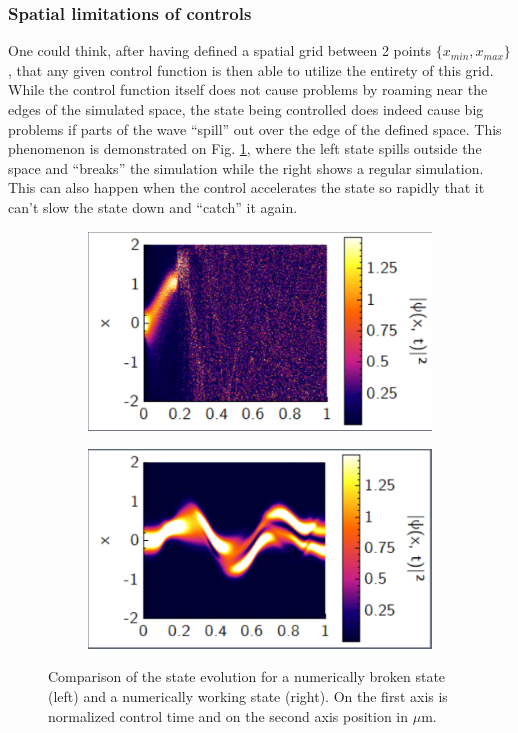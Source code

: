 \documentclass[a4paper, twocolumn]{revtex4-1}
\begin{document}
\subsubsection{Spatial limitations of controls}\label{subsubsec:spatial-limitations-of-controls}
One could think, after having defined a spatial grid between 2 points $\{x_{min},x_{max}\}$, that any given control function is then able to utilize the entirety of this grid. While the control function itself does not cause problems by roaming near the edges of the simulated space, the state being controlled does indeed cause big problems if parts of the wave ``spill'' out over the edge of the defined space. This phenomenon is demonstrated on Fig. \ref{fig:statePlots}, where the left state spills outside the space and ``breaks'' the simulation while the right shows a regular simulation. This can also happen when the control accelerates the state so rapidly that it can't slow the state down and ``catch'' it again. \\

\begin{figure}
	\begin{subfigure}{0.45\columnwidth}
		\includegraphics[width=\columnwidth]{graphics/clustering/QM2Clusteringk4A04T06178-2.PNG}
	\end{subfigure}
	\begin{subfigure}{0.45\columnwidth}
		\includegraphics[width=\columnwidth]{graphics/clustering/QM2Clusteringk5A015T07475-2.PNG}
	\end{subfigure}
	\caption{Comparison of the state evolution for a numerically broken state (left) and a numerically working state (right). On the first axis is normalized control time and on the second axis position in $\mu$m.}
	\label{fig:statePlots}
\end{figure}
\end{document}
